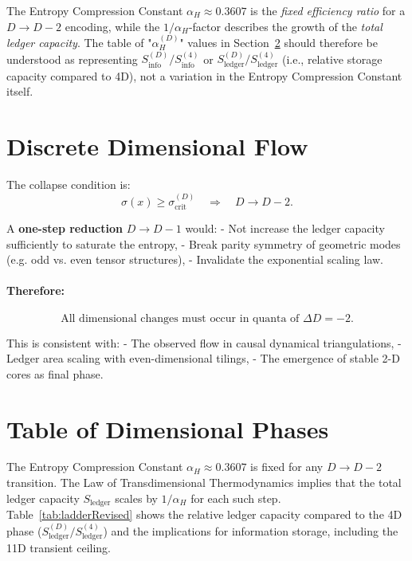 \documentclass[a4paper, 12pt, oneside]{book}
\numberwithin{equation}{chapter}
\begin{document}
The Entropy Compression Constant $\alpha_H \approx 0.3607$ is the \emph{fixed efficiency ratio} for a \(D \rightarrow D-2\) encoding, while the \(1/\alpha_H\)-factor describes the growth of the \emph{total ledger capacity}. The table of "$\alpha_H^{(D)}$" values in Section~\ref{sec:PhaseTable} should therefore be understood as representing $S_{\text{info}}^{(D)}/S_{\text{info}}^{(4)}$ or $S_{\text{ledger}}^{(D)}/S_{\text{ledger}}^{(4)}$ (i.e., relative storage capacity compared to 4D), not a variation in the Entropy Compression Constant itself.
\section{Discrete Dimensional Flow}
\label{sec:DiscreteFlow}

The collapse condition is:
\[
    \sigma(x) \geq \sigma_{\text{crit}}^{(D)} \quad\Longrightarrow\quad D \to D-2.
\]

A \textbf{one-step reduction} \( D \to D - 1 \) would:
- Not increase the ledger capacity sufficiently to saturate the entropy,
- Break parity symmetry of geometric modes (e.g. odd vs. even tensor structures),
- Invalidate the exponential scaling law.

\paragraph{Therefore:}
\[
    \boxed{
    \text{All dimensional changes must occur in quanta of } \Delta D = -2.
    }
\]

This is consistent with:
- The observed flow in causal dynamical triangulations,
- Ledger area scaling with even-dimensional tilings,
- The emergence of stable 2-D cores as final phase.

\section{Table of Dimensional Phases}
\label{sec:PhaseTable}
The Entropy Compression Constant $\alpha_H \approx 0.3607$ is fixed for any $D \to D-2$ transition. The Law of Transdimensional Thermodynamics implies that the total ledger capacity $S_{\text{ledger}}$ scales by $1/\alpha_H$ for each such step. Table~\ref{tab:ladderRevised} shows the relative ledger capacity compared to the 4D phase ($S_{\text{ledger}}^{(D)}/S_{\text{ledger}}^{(4)}$) and the implications for information storage, including the 11D transient ceiling.
\end{document}
